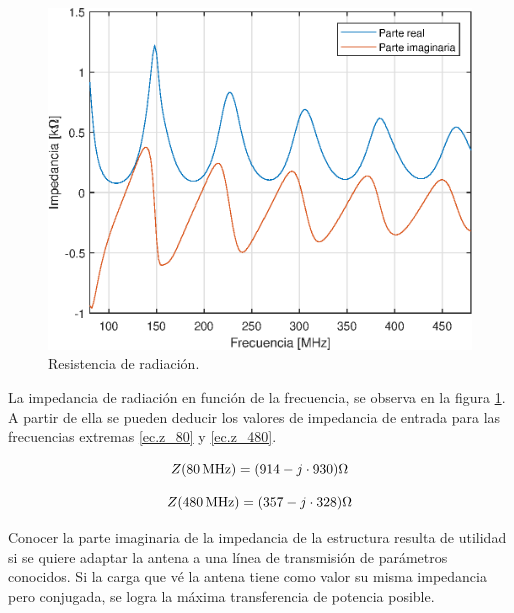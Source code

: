 \begin{figure}[H]
	\centering
	\includegraphics{imagenes/z_espacio_libre.eps}
	\caption{Resistencia de radiación.}
	\label{fig.z_radiacion}
\end{figure}

La impedancia de radiación en función de la frecuencia, se observa en la figura \ref{fig.z_radiacion}. A partir de ella se pueden deducir los valores de impedancia de entrada para las frecuencias extremas \eqref{ec.z_80} y \eqref{ec.z_480}.

\begin{equation}
	\centering
	Z(\SI{80}{\mega\hertz}) = (914 - j \cdot 930) \Omega
	\label{ec.z_80}
\end{equation}

\begin{equation}
	\centering
	Z(\SI{480}{\mega\hertz}) = (357 -j \cdot 328) \Omega
	\label{ec.z_480}
\end{equation}	

Conocer la parte imaginaria de la impedancia de la estructura resulta de utilidad si se quiere adaptar la antena a una línea de transmisión de parámetros conocidos. Si la carga que vé la antena tiene como valor su misma impedancia pero conjugada, se logra la máxima transferencia de potencia posible.